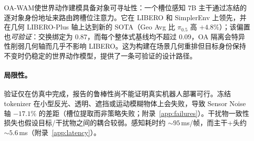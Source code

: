 \documentclass{article}
\newcommand{\method}{OA-WAM}
\begin{document}
\method{}使世界动作建模具备对象可寻址性：一个槽位感知 $7$B 主干通过冻结的逐对象身份地址来路由跨槽位注意力。它在 LIBERO 和 SimplerEnv 上领先，并在几何 LIBERO-Plus 轴上达到新的 SOTA（Geo Avg 比 $\pi_{0.5}$ 高 $+4.8$\%）；该偏置也\emph{可验证}：交换绑定为 $0.87$，而每个整体式基线均不超过 $0.09$，OA 隔离会特异性削弱几何轴而几乎不影响 LIBERO。这为构建在场景几何重排但目标身份保持不变时仍稳定的世界动作模型，提供了一条可验证的设计路径。

\paragraph{局限性。} 验证仅在仿真中完成，报告的鲁棒性尚不能证明真实机器人部署可行。冻结 tokenizer 在小型反光、透明、遮挡或运动模糊物体上会失败，导致 Sensor Noise 轴 $-17.1$\% 的差距（槽位提取而非策略失败；附录~\ref{app:failures}）。干扰物一致性损失也假设目标/干扰物之间的耦合较弱。感知耗时约 $\sim\!95$\,ms/帧，而主干+头约 $\sim\!5.6$\,ms（附录~\ref{app:latency}）。


\clearpage

\small




\newpage


% 
\end{document}
